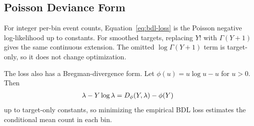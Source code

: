 \subsection{Poisson Deviance Form}

For integer per-bin event counts, Equation~\ref{eq:bdl-loss} is the Poisson negative log-likelihood up to constants.
For smoothed targets, replacing $Y!$ with $\Gamma(Y+1)$ gives the same continuous extension.
The omitted $\log\Gamma(Y+1)$ term is target-only, so it does not change optimization.

The loss also has a Bregman-divergence form.
Let $\phi(u)=u\log u-u$ for $u>0$.
Then
\begin{align}
    \lambda - Y\log\lambda
    =
    D_{\phi}(Y,\lambda) - \phi(Y)
\end{align}
up to target-only constants, so minimizing the empirical BDL loss estimates the conditional mean count in each bin.
